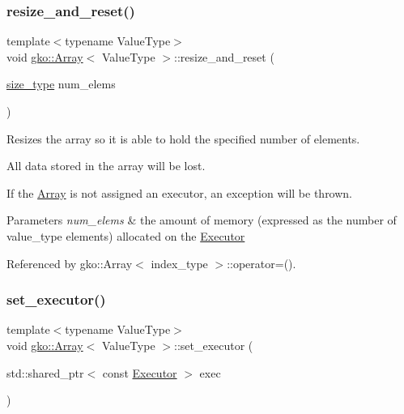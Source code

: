 \subsubsection{\texorpdfstring{resize\+\_\+and\+\_\+reset()}{resize\_and\_reset()}}
{\footnotesize\ttfamily template$<$typename Value\+Type$>$ \\
void \hyperlink{classgko_1_1Array}{gko\+::\+Array}$<$ Value\+Type $>$\+::resize\+\_\+and\+\_\+reset (\begin{DoxyParamCaption}\item[{\hyperlink{namespacegko_a6e5c95df0ae4e47aab2f604a22d98ee7}{size\+\_\+type}}]{num\+\_\+elems }\end{DoxyParamCaption})}



Resizes the array so it is able to hold the specified number of elements. 

All data stored in the array will be lost.

If the \hyperlink{classgko_1_1Array}{Array} is not assigned an executor, an exception will be thrown.


\begin{DoxyParams}{Parameters}
{\em num\+\_\+elems} & the amount of memory (expressed as the number of {\ttfamily value\+\_\+type} elements) allocated on the \hyperlink{classgko_1_1Executor}{Executor} \\
\hline
\end{DoxyParams}


Referenced by gko\+::\+Array$<$ index\+\_\+type $>$\+::operator=().

\mbox{\label{classgko_1_1Array_a44dd24e909f518f08320c3065e087d85}} 
\subsubsection{\texorpdfstring{set\+\_\+executor()}{set\_executor()}}
{\footnotesize\ttfamily template$<$typename Value\+Type$>$ \\
void \hyperlink{classgko_1_1Array}{gko\+::\+Array}$<$ Value\+Type $>$\+::set\+\_\+executor (\begin{DoxyParamCaption}\item[{std\+::shared\+\_\+ptr$<$ const \hyperlink{classgko_1_1Executor}{Executor} $>$}]{exec }\end{DoxyParamCaption})}



